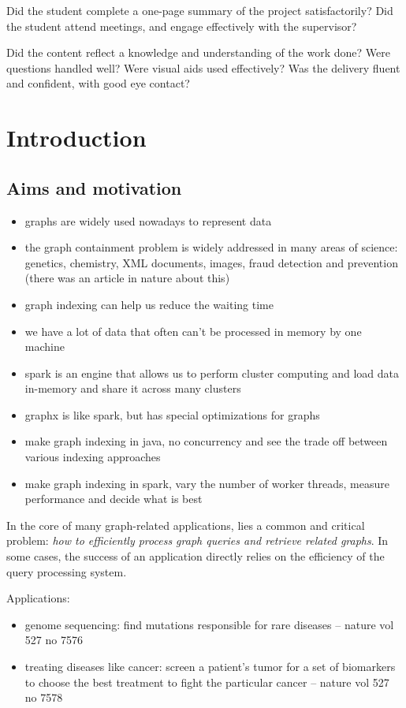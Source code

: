 \documentclass{l4proj}
\theoremstyle{definition}
\begin{document}
Did the student complete a one-page summary of the project satisfactorily?
Did the student attend meetings, and engage effectively with the supervisor?

Did the content reflect a knowledge and understanding of the work done? Were questions handled well? Were visual aids used effectively? Was the delivery fluent and confident, with good eye contact?

\chapter{Introduction}
    \section{Aims and motivation}
        \begin{itemize}
            \item graphs are widely used nowadays to represent data
            \item the graph containment problem is widely addressed in many areas of science: genetics, chemistry, XML documents, images, fraud detection and prevention (there was an article in nature about this)
            \item graph indexing can help us reduce the waiting time
            \item we have a lot of data that often can't be processed in memory by one machine
            \item spark is an engine that allows us to perform cluster computing and load data in-memory and share it across many clusters
            \item graphx is like spark, but has special optimizations for graphs
            \item make graph indexing in java, no concurrency and see the trade off between various indexing approaches
            \item make graph indexing in spark, vary the number of worker threads, measure performance and decide what is best
        \end{itemize}
        
        In the core of many graph-related applications, lies a common and critical problem: \textit{how to efficiently process graph queries and retrieve related graphs}. In some cases, the success of an application directly relies on the efficiency of the query processing system.  
        
        Applications:
        \begin{itemize}
        \item genome sequencing: find mutations responsible for rare diseases -- nature vol 527 no 7576
        \item treating diseases like cancer: screen a patient's tumor for a set of biomarkers to choose the best treatment to fight the particular cancer -- nature vol 527 no 7578
        \end{itemize}
\end{document}
